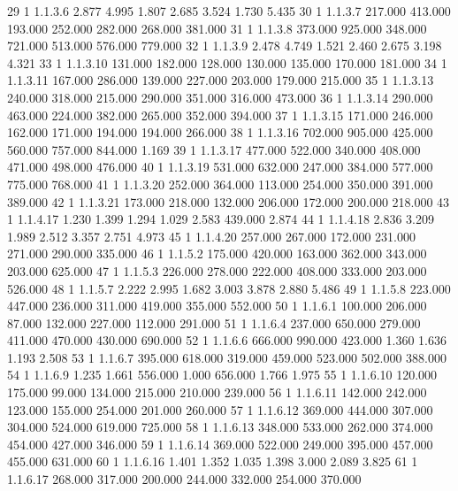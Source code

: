 \documentclass[12pt]{article}
\begin{document}
\begin{Schunk}
\begin{Soutput}
29      1      1.1.3.6   2.877   4.995   1.807   2.685   3.524   1.730   5.435
30      1      1.1.3.7 217.000 413.000 193.000 252.000 282.000 268.000 381.000
31      1      1.1.3.8 373.000 925.000 348.000 721.000 513.000 576.000 779.000
32      1      1.1.3.9   2.478   4.749   1.521   2.460   2.675   3.198   4.321
33      1     1.1.3.10 131.000 182.000 128.000 130.000 135.000 170.000 181.000
34      1     1.1.3.11 167.000 286.000 139.000 227.000 203.000 179.000 215.000
35      1     1.1.3.13 240.000 318.000 215.000 290.000 351.000 316.000 473.000
36      1     1.1.3.14 290.000 463.000 224.000 382.000 265.000 352.000 394.000
37      1     1.1.3.15 171.000 246.000 162.000 171.000 194.000 194.000 266.000
38      1     1.1.3.16 702.000 905.000 425.000 560.000 757.000 844.000   1.169
39      1     1.1.3.17 477.000 522.000 340.000 408.000 471.000 498.000 476.000
40      1     1.1.3.19 531.000 632.000 247.000 384.000 577.000 775.000 768.000
41      1     1.1.3.20 252.000 364.000 113.000 254.000 350.000 391.000 389.000
42      1     1.1.3.21 173.000 218.000 132.000 206.000 172.000 200.000 218.000
43      1     1.1.4.17   1.230   1.399   1.294   1.029   2.583 439.000   2.874
44      1     1.1.4.18   2.836   3.209   1.989   2.512   3.357   2.751   4.973
45      1     1.1.4.20 257.000 267.000 172.000 231.000 271.000 290.000 335.000
46      1      1.1.5.2 175.000 420.000 163.000 362.000 343.000 203.000 625.000
47      1      1.1.5.3 226.000 278.000 222.000 408.000 333.000 203.000 526.000
48      1      1.1.5.7   2.222   2.995   1.682   3.003   3.878   2.880   5.486
49      1      1.1.5.8 223.000 447.000 236.000 311.000 419.000 355.000 552.000
50      1      1.1.6.1 100.000 206.000  87.000 132.000 227.000 112.000 291.000
51      1      1.1.6.4 237.000 650.000 279.000 411.000 470.000 430.000 690.000
52      1      1.1.6.6 666.000 990.000 423.000   1.360   1.636   1.193   2.508
53      1      1.1.6.7 395.000 618.000 319.000 459.000 523.000 502.000 388.000
54      1      1.1.6.9   1.235   1.661 556.000   1.000 656.000   1.766   1.975
55      1     1.1.6.10 120.000 175.000  99.000 134.000 215.000 210.000 239.000
56      1     1.1.6.11 142.000 242.000 123.000 155.000 254.000 201.000 260.000
57      1     1.1.6.12 369.000 444.000 307.000 304.000 524.000 619.000 725.000
58      1     1.1.6.13 348.000 533.000 262.000 374.000 454.000 427.000 346.000
59      1     1.1.6.14 369.000 522.000 249.000 395.000 457.000 455.000 631.000
60      1     1.1.6.16   1.401   1.352   1.035   1.398   3.000   2.089   3.825
61      1     1.1.6.17 268.000 317.000 200.000 244.000 332.000 254.000 370.000

\end{Soutput}
\end{Schunk}
\end{document}
